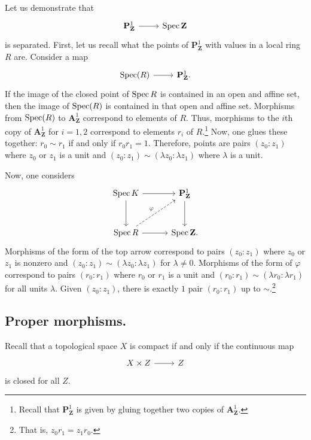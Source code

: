 \documentclass [11 pt, oneside] {article}
\begin{document}
\begin{example}[ ]\label{}\text{}
Let us demonstrate that 
\[
\begin{tikzcd}
\mathbf{P}^1_{\mathbf{Z}}\ar[r]& \Spec \mathbf{Z}
\end{tikzcd}
\] 
is separated. First, let us recall what the points of $\mathbf{P}^1_{\mathbf{Z}}$ with values in a local ring $R$ are. Consider a map 
\[
\begin{tikzcd}
\Spec(R)\ar[r]&\mathbf{P}^1_{\mathbf{Z}}.
\end{tikzcd}
\] 
If the image of the closed point of $\operatorname{Spec} R$ is contained in an open and affine set, then the image of $\operatorname{Spec} (R)$ is contained in that open and affine set. Morphisms from $\operatorname{Spec} (R)$ to $\mathbf{A}^1_{\mathbf{Z}}$ correspond to elements of $R$. 
Thus, morphisms to the $i$th copy of $\mathbf{A}^1_{\mathbf{Z}}$ for $i=1,2$ correspond to elements $r_i$ of $R$.\footnote{Recall that $\mathbf{P}^1_{\mathbf{Z}}$ is given by gluing together two copies of $\mathbf{A}^1_{\mathbf{Z}}$.} Now, one glues these together: $r_0\sim r_1$ if and only if $r_0r_1 = 1$. Therefore, points are pairs $(z_0:z_1)$ where $z_0$ or $z_1$ is a unit and $(z_0:z_1)\sim (\lambda z_0:\lambda z_1)$ where $\lambda$ is a unit.

Now, one considers
\[
\begin{tikzcd}[column sep = 3 em, row sep = 3 em]
	\Spec K \ar[r]\ar[d] & \mathbf{P}^1_{\mathbf{Z}}\ar[d]\\
	\Spec R \ar[r]\ar[ur,dashed,"\varphi"] &\Spec \mathbf{Z}.
\end{tikzcd}
\]
Morphisms of the form of the top arrow correspond to pairs $(z_0:z_1)$ where $z_0$ or $z_1$ is nonzero and $(z_0:z_1)\sim(\lambda z_0:\lambda z_1)$ for $\lambda\ne 0$. Morphisms of the form of $\varphi$ correspond to pairs $(r_0:r_1)$ where $r_0$ or $r_1$ is a unit and $(r_0:r_1)\sim(\lambda r_0:\lambda r_1)$ for all units $\lambda$.
Given $(z_0:z_1)$, there is exactly $1$ pair $(r_0:r_1)$ up to $\sim$.\footnote{That is, $z_0r_1 = z_1r_0$.}
\end{example}

\subsection{Proper morphisms.}
Recall that a topological space $X$ is compact if and only if the continuous map 
\[
\begin{tikzcd}
X\times Z\ar[r]&Z
\end{tikzcd}
\] 
is closed for all $Z$.
\end{document}
